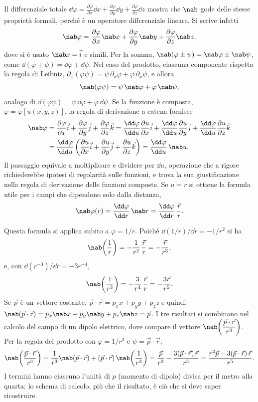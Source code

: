\documentclass[main.tex]{subfiles}
\begin{document}
Il differenziale totale $\dd\varphi=\frac{\partial\varphi}{\partial x}\dd x+\frac{\partial\varphi}{\partial y}\dd y+\frac{\partial\varphi}{\partial z}\dd z$ mostra che $\nab$ gode delle stesse proprietà formali, perché è un operatore differenziale lineare. Si scrive infatti
\[
\nab\varphi=\frac{\partial\varphi}{\partial x}\nab x+\frac{\partial\varphi}{\partial y}\nab y+\frac{\partial\varphi}{\partial z}\nab z ,
\]
dove si è usato $\nab x=\vec i$ e simili. Per la somma, $\nab(\varphi\pm\psi)=\nab\varphi\pm\nab\psi$, come $\dd(\varphi\pm\psi)=\dd\varphi\pm\dd\psi$. Nel caso del prodotto, ciascuna componente rispetta la regola di Leibniz, $\partial_x(\varphi\psi)=\psi\,\partial_x\varphi+\varphi\,\partial_x\psi$, e allora
\[
\nab(\varphi\psi)=\psi\,\nab\varphi+\varphi\,\nab\psi ,
\]
analogo di $\dd(\varphi\psi)=\psi\,\dd\varphi+\varphi\,\dd\psi$. Se la funzione è composta, $\varphi=\varphi[u(x,y,z)]$, la regola di derivazione a catena fornisce
\begin{align*}
\nab\varphi&=\frac{\partial\varphi}{\partial x}\vec i+\frac{\partial\varphi}{\partial y}\vec j+\frac{\partial\varphi}{\partial z}\vec k
=\frac{\dd\varphi}{\dd u}\frac{\partial u}{\partial x}\vec i+\frac{\dd\varphi}{\dd u}\frac{\partial u}{\partial y}\vec j+\frac{\dd\varphi}{\dd u}\frac{\partial u}{\partial z}\vec k\\
&=\frac{\dd\varphi}{\dd u}\left(\frac{\partial u}{\partial x}\vec i+\frac{\partial u}{\partial y}\vec j+\frac{\partial u}{\partial z}\vec k\right)=\frac{\dd\varphi}{\dd u}\,\nab u .
\end{align*}
Il passaggio equivale a moltiplicare e dividere per $\dd u$, operazione che a rigore richiederebbe ipotesi di regolarità sulle funzioni, e trova la sua giustificazione nella regola di derivazione delle funzioni composte. Se $u=r$ si ottiene la formula utile per i campi che dipendono solo dalla distanza,
\[
\nab\varphi(r)=\frac{\dd\varphi}{\dd r}\,\nab r=\frac{\dd\varphi}{\dd r}\,\frac{\vec r}{r}.
\]

Questa formula si applica subito a $\varphi=1/r$. Poiché $\dd(1/r)/\dd r=-1/r^2$ si ha
\[
\nab\!\left(\frac1r\right)=-\frac1{r^2}\,\frac{\vec r}{r}=-\frac{\vec r}{r^3},
\]
e, con $\dd(r^{-3})/\dd r=-3r^{-4}$,
\[
\nab\!\left(\frac1{r^3}\right)=-\frac{3}{r^4}\,\frac{\vec r}{r}=-\frac{3\vec r}{r^5}.
\]
Se $\vec p$ è un vettore costante, $\vec p\cdot\vec r=p_xx+p_yy+p_zz$ e quindi $\nab(\vec p\cdot\vec r)=p_x\nab x+p_y\nab y+p_z\nab z=\vec p$. I tre risultati si combinano nel calcolo del campo di un dipolo elettrico, dove compare il vettore $\nab\!\left(\dfrac{\vec p\cdot\vec r}{r^3}\right)$. Per la regola del prodotto con $\varphi=1/r^3$ e $\psi=\vec p\cdot\vec r$,
\[
\nab\!\left(\frac{\vec p\cdot\vec r}{r^3}\right)=\frac1{r^3}\nab(\vec p\cdot\vec r)+(\vec p\cdot\vec r)\,\nab\!\left(\frac1{r^3}\right)
=\frac{\vec p}{r^3}-\frac{3(\vec p\cdot\vec r)\,\vec r}{r^5}=\frac{r^2\vec p-3(\vec p\cdot\vec r)\,\vec r}{r^5}.
\]
I termini hanno ciascuno l'unità di $p$ (momento di dipolo) divisa per il metro alla quarta; lo schema di calcolo, più che il risultato, è ciò che si deve saper ricostruire.
\end{document}
